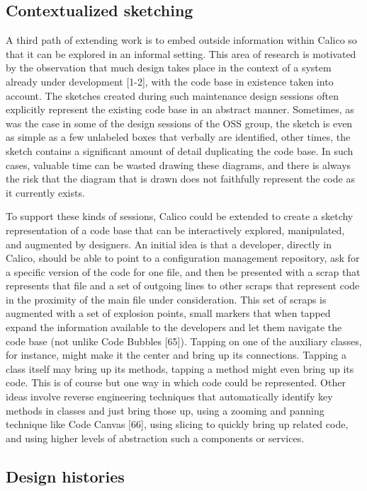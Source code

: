 \documentclass[12pt,fleqn]{ucithesis}
\begin{document}
\subsection{Contextualized sketching}

A third path of extending work is to embed outside information within Calico so that it can be explored in an informal setting. This area of research is motivated by the observation that much design takes place in the context of a system already under development [1-2], with the code base in existence taken into account. The sketches created during such maintenance design sessions often explicitly represent the existing code base in an abstract manner. Sometimes, as was the case in some of the design sessions of the OSS group, the sketch is even as simple as a few unlabeled boxes that verbally are identified, other times, the sketch contains a significant amount of detail duplicating the code base. In such cases, valuable time can be wasted drawing these diagrams, and there is always the risk that the diagram that is drawn does not faithfully represent the code as it currently exists.

To support these kinds of sessions, Calico could be extended to create a sketchy representation of a code base that can be interactively explored, manipulated, and augmented by designers. An initial idea is that a developer, directly in Calico, should be able to point to a configuration management repository, ask for a specific version of the code for one file, and then be presented with a scrap that represents that file and a set of outgoing lines to other scraps that represent code in the proximity of the main file under consideration. This set of scraps is augmented with a set of explosion points, small markers that when tapped expand the information available to the developers and let them navigate the code base (not unlike Code Bubbles [65]). Tapping on one of the auxiliary classes, for instance, might make it the center and bring up its connections. Tapping a class itself may bring up its methods, tapping a method might even bring up its code. This is of course but one way in which code could be represented. Other ideas involve reverse engineering techniques that automatically identify key methods in classes and just bring those up, using a zooming and panning technique like Code Canvas [66], using slicing to quickly bring up related code, and using higher levels of abstraction such a components or services.

\subsection{Design histories}
\end{document}
